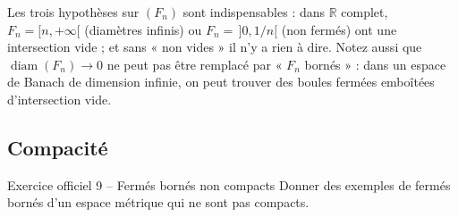 \documentclass[11pt,a4paper]{article}
\newcommand{\R}{\mathbb{R}}
\newcommand{\diam}{\operatorname{diam}}
\theoremstyle{definition}
\begin{document}
\begin{piege}
Les trois hypothèses sur $(F_n)$ sont indispensables : dans $\R$ complet, $F_n=[n,+\infty[$ (diamètres infinis) ou $F_n=\,]0,1/n[$ (non fermés) ont une intersection vide ; et sans « non vides » il n'y a rien à dire. Notez aussi que $\diam(F_n)\to0$ ne peut pas être remplacé par « $F_n$ bornés » : dans un espace de Banach de dimension infinie, on peut trouver des boules fermées emboîtées d'intersection vide.
\end{piege}

\subsection*{Compacité}

\begin{exo}{Exercice officiel 9 -- Fermés bornés non compacts}
Donner des exemples de fermés bornés d'un espace métrique qui ne sont pas compacts.
\end{exo}
\end{document}
